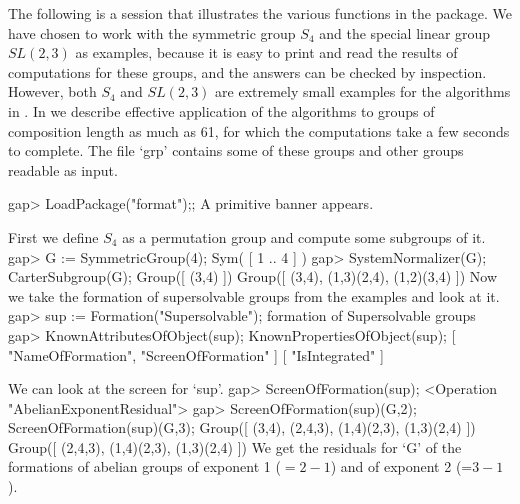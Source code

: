



The following is a {\GAP} session that illustrates the various functions
in the package.  We have chosen to work with the symmetric group $S_4$
and the special linear group $SL(2,3)$ as examples, because it is easy
to print and read the results of computations for these groups, and the
answers can be checked by inspection. However, both
$S_4$ and $SL(2,3)$ are extremely small examples for the algorithms in
\FORMAT. In
\cite{EW} we describe effective application of the algorithms  to groups
of  composition length as much as 61, for which the computations take
a few seconds to complete. The file `grp' contains some of these groups and other groups readable as {\GAP} input.

\beginexample
gap> LoadPackage("format");;
\endexample
A primitive banner appears.

First we define $S_4$ as a permutation group and compute some 
subgroups of it.
\beginexample
gap> G := SymmetricGroup(4);
Sym( [ 1 .. 4 ] )
gap> SystemNormalizer(G);  CarterSubgroup(G);
Group([ (3,4) ])
Group([ (3,4), (1,3)(2,4), (1,2)(3,4) ])
\endexample
Now we take the formation of supersolvable groups from the examples
and look at it.
\beginexample
gap> sup := Formation("Supersolvable");
formation of Supersolvable groups
gap> KnownAttributesOfObject(sup); KnownPropertiesOfObject(sup);
[ "NameOfFormation", "ScreenOfFormation" ]
[ "IsIntegrated" ]
\endexample 

We can look at the screen for `sup'.
\beginexample
gap> ScreenOfFormation(sup);
<Operation "AbelianExponentResidual">
gap> ScreenOfFormation(sup)(G,2); ScreenOfFormation(sup)(G,3);
Group([ (3,4), (2,4,3), (1,4)(2,3), (1,3)(2,4) ])
Group([ (2,4,3), (1,4)(2,3), (1,3)(2,4) ])
\endexample
We get the residuals for `G' of the formations of abelian groups of exponent 1 ($= 2-1$) and of exponent 2 (=$3-1$).

